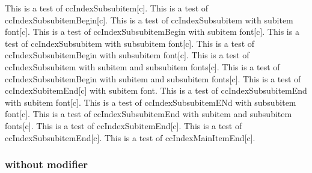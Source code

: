 \documentclass{article}
\begin{document}
{{{{This is a test of ccIndexSubsubitem[c].
This is a test of ccIndexSubsubitemBegin[c].
This is a test of ccIndexSubsubitem with subitem font[c].
This is a test of ccIndexSubsubitemBegin with subitem font[c].
This is a test of ccIndexSubsubitem with subsubitem font[c].
This is a test of ccIndexSubsubitemBegin with subsubitem font[c].
This is a test of ccIndexSubsubitem with subitem and subsubitem fonts[c].
This is a test of ccIndexSubsubitemBegin with subitem and subsubitem fonts[c].
\pagebreak
This is a test of ccIndexSubitemEnd[c] with subitem font.
This is a test of ccIndexSubsubitemEnd with subitem font[c].
This is a test of ccIndexSubsubitemENd with subsubitem font[c].
This is a test of ccIndexSubsubitemEnd with subitem and subsubitem fonts[c].
This is a test of ccIndexSubitemEnd[c].
This is a test of ccIndexSubsubitemEnd[c].
This is a test of ccIndexMainItemEnd[c].

\subsubsection{without modifier}

}}}}
\end{document}
